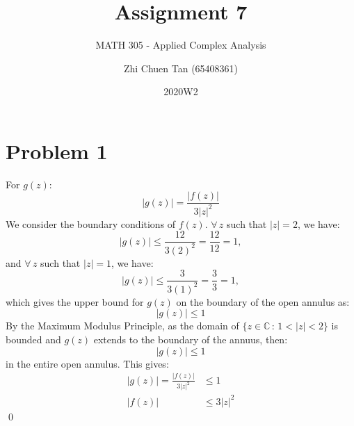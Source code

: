 \documentclass[a4paper, titlepage, DIV=14]{scrartcl}
\title{Assignment 7}
\subtitle{MATH 305 - Applied Complex Analysis}
\author{Zhi Chuen Tan (65408361)}
\date{2020W2}
\begin{document}
    \onehalfspacing
    \hypersetup{pageanchor=false}
    \begin{titlepage}
        \maketitle
        \vfill
        
    \end{titlepage}
    \hypersetup{pageanchor=true}

    \section*{Problem 1}
    For $g(z)$:
    \begin{equation*}
        |g(z)| = \frac{|f(z)|}{3|z|^{2}}
    \end{equation*}
    We consider the boundary conditions of $f(z)$. $\forall \, z$ such that $|z|=2$, we have:
    \begin{equation*}
        |g(z)| \leq \frac{12}{3(2)^{2}} = \frac{12}{12} = 1,
    \end{equation*}
    and $\forall \, z$ such that $|z|=1$, we have:
    \begin{equation*}
        |g(z)| \leq \frac{3}{3(1)^{2}} = \frac{3}{3} = 1,
    \end{equation*}
    which gives the upper bound for $g(z)$ on the boundary of the open annulus as:
    \begin{equation*}
        |g(z)| \leq 1
    \end{equation*}
    By the Maximum Modulus Principle, as the domain of $\{z\in \mathbb{C} \, : \, 1<|z|<2\}$ is bounded and
    $g(z)$ extends to the boundary of the annuus, then:
    \begin{equation*}
        |g(z)| \leq 1
    \end{equation*}
    in the entire open annulus. This gives:
    \begin{align*}
        |g(z)| = \frac{|f(z)|}{3|z|^{2}} &\leq 1 \\
        |f(z)| &\leq 3|z|^{2}
    \end{align*} \qed
    
\end{document}
